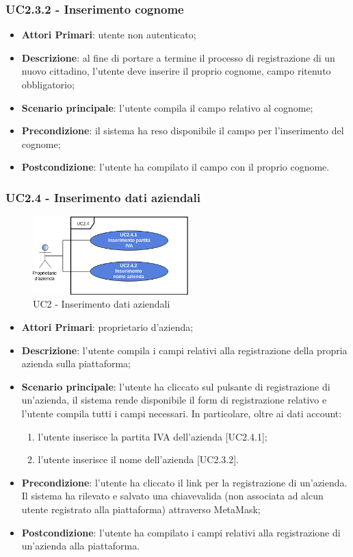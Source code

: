 \subsubsection{UC2.3.2 - Inserimento cognome}
\begin{itemize}
	\item \textbf{Attori Primari}: utente non autenticato;
	\item \textbf{Descrizione}: al fine di portare a termine il processo di registrazione di un nuovo cittadino, l'utente deve inserire il proprio cognome, campo ritenuto obbligatorio;
	\item \textbf{Scenario principale}: l'utente compila il campo relativo al cognome;
	\item \textbf{Precondizione}: il sistema ha reso disponibile il campo per l'inserimento del cognome;
	\item \textbf{Postcondizione}: l'utente ha compilato il campo con il proprio cognome.
\end{itemize}

\subsubsection{UC2.4 - Inserimento dati aziendali}
\begin{figure}[h]
	\includegraphics[width=6cm]{res/images/UC2-4RegistrazioneAzienda.png}
	\centering
	\caption{UC2 - Inserimento dati aziendali}
\end{figure}
\begin{itemize}
	\item \textbf{Attori Primari}: proprietario d'azienda;
	\item \textbf{Descrizione}: l'utente compila i campi relativi alla registrazione della propria azienda sulla piattaforma;
	\item \textbf{Scenario principale}: l'utente ha cliccato sul pulsante di registrazione di un'azienda, il sistema rende disponibile il form di registrazione relativo e l'utente compila tutti i campi necessari. In particolare, oltre ai dati account:
	\begin{enumerate}[label=\alph*.]
		\item l'utente inserisce la partita IVA dell'azienda [UC2.4.1];
		\item l'utente inserisce il nome dell'azienda [UC2.3.2].
	\end{enumerate}
	\item \textbf{Precondizione}: l'utente ha cliccato il link per la registrazione di un'azienda. Il sistema ha rilevato e salvato una chiave\glosp valida (non associata ad alcun utente registrato alla piattaforma) attraverso MetaMask\glo;
	\item \textbf{Postcondizione}: l'utente ha compilato i campi relativi alla registrazione di un'azienda alla piattaforma.
\end{itemize}
